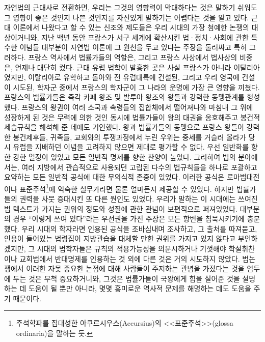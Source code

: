 자연법의 근대사로 전환하면, 우리는 그것의 영향력이 막대하다는 것은
말하기 쉬워도 그 영향이 좋은 것인지 나쁜 것인지를 자신있게
말하기는 어렵다는 것을 알고 있다.
근대  이론에서 나왔다고 할 수 있는 신조와 제도들은
우리 시대의 가장 첨예한 논쟁의 대상이거니와,
지난 백년 동안 프랑스가 서구 세계에 확산시킨 법·정치·사회에 관한
특수한 이념들 대부분이 자연법 이론에 그 원천을 두고 있다는 주장을 둘러싸고
특히 그러하다.
프랑스 역사에서 법률가들의 역할은,
그리고 프랑스 사상에서 법사상의 비중은,
언제나 대단히 컸다.
근대 유럽 법학이 발흥한 곳은 사실 프랑스가 아니라 이탈리아였지만,
이탈리아로 유학하고 돌아와 전 유럽대륙에 건설된,
그리고  우리 영국에 건설이 시도된,
학자군 중에서 프랑스의 학자군이 그 나라의 운명에 가장 큰
영향을 끼쳤다.
프랑스의 법률가들은 즉각 카페 왕조 및 발루아 왕조의 왕들과
강력한 동맹관계를 형성했다.
프랑스의 왕권이 여러 소국과 속령들의 집합체에서 떨어져나와
마침내 그 위에 성장하게 된 것은 무력에 의한 것인 동시에
법률가들이 왕의 대권을 옹호해주고 봉건적 세습규칙을 해석해 준 데에도 기인했다.
왕과 법률가들의 동맹으로 프랑스 왕들이
강력한 봉건제후들, 귀족들, 교회와의 투쟁과정에서 누린 우위는
중세를 거슬러 올라가 당시 유럽을 지배하던 이념을 고려하지 않으면
제대로 평가할 수 없다.
우선 일반화를 향한 강한 열정이 있었고 모든 일반적 명제를 향한 찬양이 높았다.
그리하여 법의 분야에서는, 여러 지방에서 관습적으로 사용되던 고립된
다수의 법규칙들을 하나로
포괄하고 요약하는 모든 일반적 공식에 대한 무의식적 존중이 있었다.
이러한 공식은 로마법대전이나 표준주석\footnote{%
  주석학파를 집대성한
  아쿠르시우스(Accursius)의 <<표준주석>>(glossa ordinaria)을 말하는 듯.}에
익숙한 실무가라면 물론 얼마든지 제공할 수 있었다.
하지만 법률가들의 권력을 사뭇 증대시킨 또 다른 원인도 있었다.
우리가 말하는 이 시대에는 쓰여진 법 텍스트가 가지는 권위의 정도와 성질에 관한
관념이 보편적으로 퍼져있었다.
대부분의 경우 ``이렇게 쓰여 있다''라는 우선권을 가진
주장은 모든 항변을 침묵시키기에 충분했다.
우리 시대의 학자라면 인용된 공식을 조바심내며 조사하고,
그 출처를 따져묻고,  인용이 들어있는 법령집이
지방관습을 대체할 만한 권위를 가지고 있지 않다고 부인하겠지만,
그 시대의 법학자들은 규칙의 적용가능성을 의문시하거나
기껏해야 학설휘찬이나 교회법에서 반대명제를 인용하는 것 외에
다른 것은 거의 시도하지 않았다.
법논쟁에서 이러한 자못 중요한 논점에 대해 사람들이 주저하는 관념을 가졌다는 것을
염두에 두는 것은 무척 중요하거니와,
그것은 법률가들이 국왕에게 힘을 실어준 것을 설명하는 데 도움이 될 뿐만 아니라,
몇몇 흥미로운 역사적 문제를 해명하는 데도 도움을 주기 때문이다.
